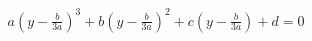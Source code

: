 \documentclass[preview]{standalone}
\begin{document}
\begin{align*}
a \left(y-\frac{b}{3a}\right)^3 + b \left(y-\frac{b}{3a}\right)^2 + c \left(y-\frac{b}{3a}\right) + d = 0
\end{align*}
\end{document}
